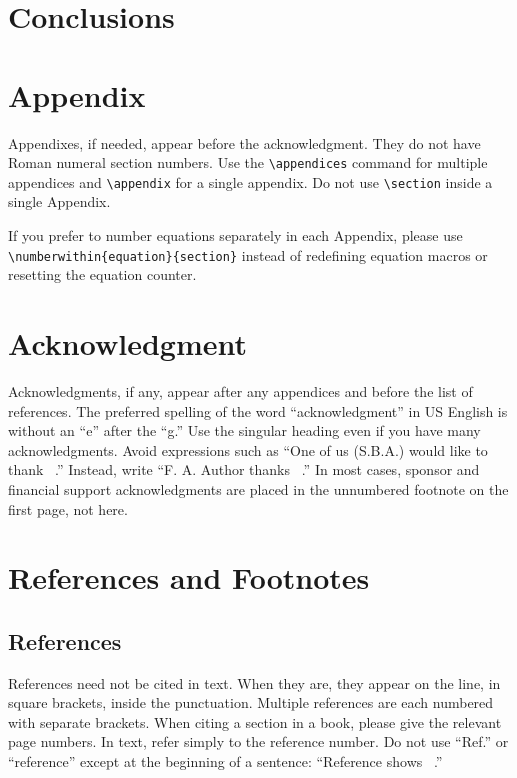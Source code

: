 \documentclass{IEEEtran}
\begin{document}
\section{Conclusions}

\appendices

\section*{Appendix}

Appendixes, if needed, appear before the acknowledgment. They do not have
Roman numeral section numbers. Use
the \verb|\appendices| command for multiple appendices and
\verb|\appendix| for a single appendix. Do not use \verb|\section|
inside a single Appendix.

If you prefer to number equations separately in each Appendix, please
use \verb|\numberwithin{equation}{section}| instead of redefining
equation macros or resetting the equation counter.

\section*{Acknowledgment}

Acknowledgments, if any, appear after any appendices and before the list of
references. The preferred spelling of the word ``acknowledgment'' in US
English is without an ``e'' after the ``g.'' Use the singular heading even
if you have many acknowledgments. Avoid expressions such as ``One of us
(S.B.A.) would like to thank \textellipsis~.'' Instead, write ``F. A. Author thanks
\textellipsis~.'' In most cases, sponsor and financial support acknowledgments are
placed in the unnumbered footnote on the first page, not here.

\section*{References and Footnotes}

\subsection{References}
References need not be cited in text. When they are, they appear on the
line, in square brackets, inside the punctuation. Multiple references are
each numbered with separate brackets. When citing a section in a book,
please give the relevant page numbers. In text, refer simply to the
reference number. Do not use ``Ref.'' or ``reference'' except at the
beginning of a sentence: ``Reference \cite{b3} shows \textellipsis~.''
\end{document}
